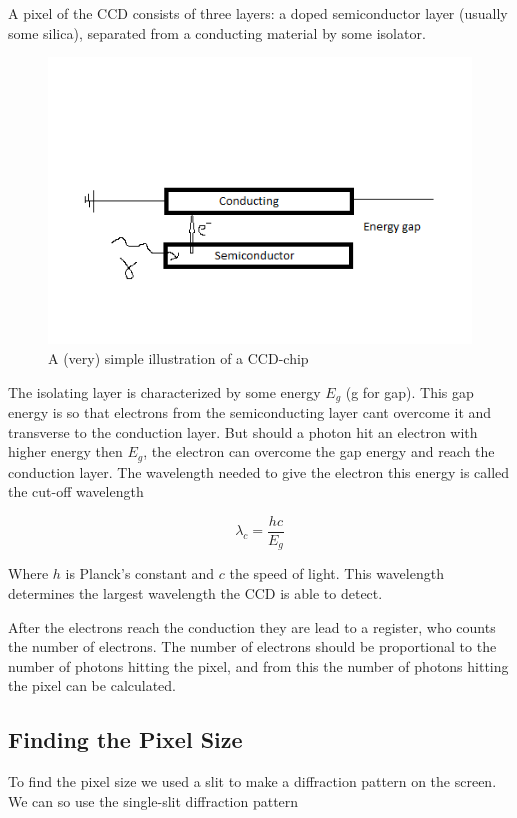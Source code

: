 \documentclass{emulateapj}
\begin{document}
A pixel of the CCD consists of three layers: a doped semiconductor layer (usually some silica), separated from a conducting material by some isolator. 

\begin{figure}[H]
\centering
\includegraphics[scale=0.4]{ccd.png}
\caption{A (very) simple illustration of a CCD-chip}
\end{figure}


The isolating layer is characterized by some energy $E_g$ (g for gap). This gap energy is so that electrons from the semiconducting layer cant overcome it and transverse to the conduction layer. But should a photon hit an electron with higher energy then $E_g$, the electron can overcome the gap energy and reach the conduction layer. The wavelength needed to give the electron this energy is called the cut-off wavelength

\begin{equation}
\lambda_{c} = \frac{hc}{E_g}
\end{equation}

Where $h$ is Planck's constant and $c$ the speed of light. This wavelength determines the largest wavelength the CCD is able to detect. 

After the electrons reach the conduction they are lead to a register, who counts the number of electrons. The number of electrons should be proportional to the number of photons hitting the pixel, and from this the number of photons hitting the pixel can be calculated.


\subsection{Finding the Pixel Size}
\label{sec:pixSize}
To find the pixel size we used a slit to make a diffraction pattern on the screen. We can so use the single-slit diffraction pattern
\end{document}
